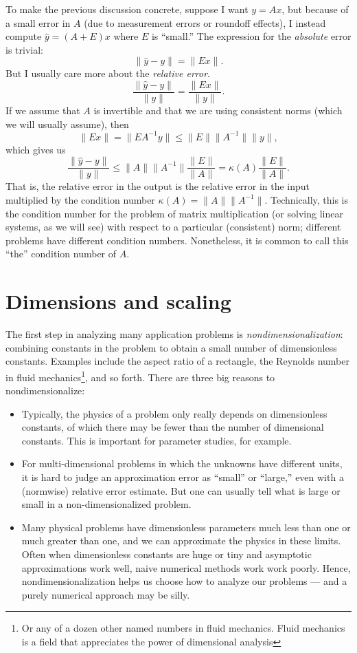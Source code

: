 \documentclass[12pt, leqno]{article}
\begin{document}
To make the previous discussion concrete, suppose I want $y = Ax$, but
because of a small error in $A$ (due to measurement errors or roundoff
effects), I instead compute $\hat{y} = (A+E)x$ where $E$ is ``small.''
The expression for the {\em absolute} error is trivial:
\[
  \|\hat{y}-y\| = \|Ex\|.
\]
But I usually care more about the {\em relative error}.
\[
  \frac{\|\hat{y}-y\|}{\|y\|} = \frac{\|Ex\|}{\|y\|}.
\]
If we assume that $A$ is invertible and that we are using consistent
norms (which we will usually assume), then
\[
  \|Ex\| = \|E A^{-1} y\| \leq \|E\| \|A^{-1}\| \|y\|,
\]
which gives us
\[
  \frac{\|\hat{y}-y\|}{\|y\|} \leq \|A\| \|A^{-1}\|
  \frac{\|E\|}{\|A\|} = \kappa(A) \frac{\|E\|}{\|A\|}.
\]
That is, the relative error in the output is the relative error in the
input multiplied by the condition number
$\kappa(A) = \|A\| \|A^{-1}\|$.
%
Technically, this is the condition number for the problem of matrix
multiplication (or solving linear systems, as we will see) with
respect to a particular (consistent) norm; different problems have
different condition numbers.  Nonetheless, it is common to call this
``the'' condition number of $A$.

\section{Dimensions and scaling}

The first step in analyzing many application problems is
{\em nondimensionalization}: combining constants in the
problem to obtain a small number of dimensionless constants.
Examples include the aspect ratio of a rectangle,
the Reynolds number in fluid mechanics\footnote{%
Or any of a dozen other named numbers in fluid mechanics.  Fluid
mechanics is a field that appreciates the power of dimensional
analysis}, and so forth.  There are three big reasons to
nondimensionalize:
\begin{itemize}
\item
  Typically, the physics of a problem only really depends on
  dimensionless constants, of which there may be fewer than
  the number of dimensional constants.  This is important
  for parameter studies, for example.
\item
  For multi-dimensional problems in which the unknowns have different
  units, it is hard to judge an approximation error as ``small'' or
  ``large,'' even with a (normwise) relative error estimate.  But one
  can usually tell what is large or small in a non-dimensionalized
  problem.
\item
  Many physical problems have dimensionless parameters much less than
  one or much greater than one, and we can approximate the physics in
  these limits.  Often when dimensionless constants are huge or tiny
  and asymptotic approximations work well, naive numerical methods
  work work poorly.  Hence, nondimensionalization helps us choose how
  to analyze our problems --- and a purely numerical approach may be
  silly.
\end{itemize}
\end{document}
